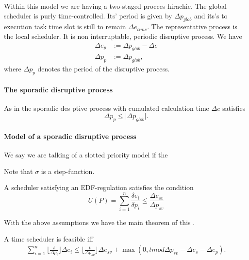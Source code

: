 Within this model we are having a two-staged procces hirachie. 
The global scheduler is purly time-controlled.
Its' period is given by $\Delta p_{glob}$ and its's to execution task time slot is still to remain $\Delta e_{time}$.
The representative process is the local scheduler. 
It is non interruptable, periodic disruptive process.
We have
\begin{align}
\Delta e_p &:= \Delta p_{glob} - \Delta e\\
\Delta p_{p} &:= \Delta p_{glob}, 
\end{align}
where $\Delta p_{p}$ denotes the period of the disruptive process.

\paragraph{The sporadic disruptive process}
As in \cite{K} the sporadic des
ptive process with cumulated calculation time $\Delta e$ satisfies
\begin{equation}
\Delta p_{p} \leq \lvert{\Delta p_{glob}} \rvert. 
\end{equation}


\paragraph{Model of a sporadic disruptive process}
We say we are talking of a slotted priority model if the 

\begin{remark}
Note that $\sigma$ is a step-function. 
\end{remark}


\begin{remark} A scheduler satisfying an EDF-regulation satisfies the condition
	\begin{equation}
	U(P) = \sum\limits_{i=1}^n \frac{\delta e_i}{\delta p_i} \leq 		\frac{\Delta e_{sv}}{\Delta p_{sv}}
	\end{equation}
\end{remark}

With the above assumptions we have the main theorem of this \cite{K}.
\begin{theorem}
A time scheduler is feasible iff 
	\begin{align}
	\sum_{i=1}^n \lfloor \frac{t}{\Delta p_i} \rfloor \Delta e_i \leq \lfloor  \frac{t}{\Delta p_{sv}} \rfloor \Delta e_{sv} + \max (0,t  mod \Delta p_{sv} -\Delta e_{s} -\Delta e_p).
	\end{align}
\end{theorem}

